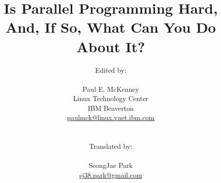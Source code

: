 \documentclass[10pt,twocolumn]{book}
\begin{document}
\makeatletter
\renewcommand\lstinline[1][]{%
\leavevmode\bgroup %
\def\lst@boxpos{b}%
\lsthk@PreSet\lstset{flexiblecolumns,#1}%
\lsthk@TextStyle
\ifnum\iffalse{\fi`}=\z@\fi
\@ifnextchar\bgroup{%
\ifnum`{=\z@}\fi%
\afterassignment\lst@InlineG \let\@let@token}{%
\ifnum`{=\z@}\fi\lstinline@}}
\makeatother
% ---  End of workaround for Fedora 23 Texlive bug
\newcommand{\co}[1]{\lstinline[breaklines=true,breakatwhitespace=true]{#1}}

\title{Is Parallel Programming Hard, And, If So, What Can You Do About It?}
\author{
	Edited by: \\
	\\
	Paul E. McKenney \\
	Linux Technology Center \\
	IBM Beaverton \\
	\href{mailto:paulmck@linux.vnet.ibm.com}{paulmck@linux.vnet.ibm.com} \\
	\\
	\\
	Translated by: \\
	\\
	SeongJae Park \\
	\href{mailto:sj38.park@gmail.com}{sj38.park@gmail.com} \\
	\\
} %

\setcounter{topnumber}{3}
\renewcommand\topfraction{.75}
\setcounter{bottomnumber}{2}
\renewcommand\bottomfraction{.3}
\setcounter{totalnumber}{5}
\renewcommand\textfraction{.15}
\renewcommand\floatpagefraction{.5}
\setcounter{dbltopnumber}{3}
\renewcommand\dbltopfraction{.75}
\renewcommand\dblfloatpagefraction{.5}

\setlength{\textheight}{8.25in}
\setlength{\textwidth}{6.5in}
\setlength{\columnsep}{0.25in}

\newcommand{\IfInBook}[2]{\ifthenelse{\boolean{inbook}}{#1}{#2}}
\newcommand{\IfTwoColumn}[2]{\ifthenelse{\boolean{twocolumn}}{#1}{#2}}
\newcommand{\IfHardCover}[2]{\ifthenelse{\boolean{hardcover}}{#1}{#2}}

\IfHardCover{
\setlength{\topmargin}{13pt}
\setlength{\evensidemargin}{-4pt}
}{}
\end{document}
